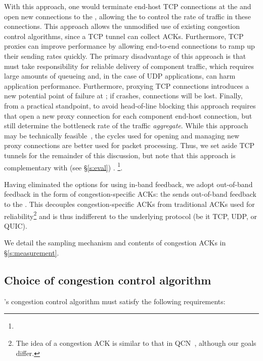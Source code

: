  With this approach, one would terminate end-host TCP connections at the \inbox and open new connections to the \outbox, allowing the \inbox to control the rate of traffic in these connections.
This approach allows the unmodified use of existing congestion control algorithms, since a TCP tunnel can collect ACKs. Furthermore, TCP proxies can improve performance by allowing end-to-end connections to ramp up their sending rates quickly.
The primary disadvantage of this approach is that \name must take responsibility for reliable delivery of component traffic, which requires large amounts of queueing and, in the case of UDP applications, can harm application performance. 
Furthermore, proxying TCP connections introduces a new potential point of failure at \name; if \name crashes, connections will be lost.
Finally, from a practical standpoint, to avoid head-of-line blocking this approach requires that \name open a new proxy connection for each component end-host connection, but still determine the bottleneck rate of the traffic \emph{aggregate}. While this approach may be technically feasible~\cite{cm}, the cycles used for opening and managing new proxy connections are better used for packet processing.
Thus, we set aside TCP tunnels for the remainder of this discussion, but note that this approach is complementary with \name (see \S\ref{s:eval}) .
\footnote{}.


 Having eliminated the options for using in-band feedback, we adopt out-of-band feedback in the form of congestion-specific ACKs: the \outbox sends out-of-band feedback to the \inbox.
This decouples congestion-specific ACKs from traditional ACKs used for reliability\footnote{The idea of a congestion ACK is similar to that in QCN~\cite{qcn}, although our goals differ.} and is thus indifferent to the underlying protocol (be it TCP, UDP, or QUIC).

We detail the sampling mechanism and contents of congestion ACKs in \S\ref{s:measurement}.

\subsection{Choice of congestion control algorithm}\label{s:design:whichcc}
\name's congestion control algorithm must satisfy the following requirements: 

